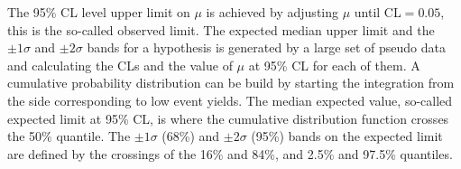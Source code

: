 The 95\% CL level upper limit on $\mu$ is achieved by adjusting $\mu$ until CL$ = 0.05$, this is the so-called observed limit. The expected median upper limit and the $\pm 1\sigma$ and $\pm 2 \sigma$ bands for a hypothesis is generated by a large set of pseudo data and calculating the CLs and the value of $\mu$ at 95\% CL for each of them. A cumulative probability distribution can be build by starting the integration from the side corresponding to low event yields. The median expected value, so-called expected limit at 95\% CL, is where the cumulative distribution function crosses the 50\% quantile. The $\pm 1 \sigma$ (68\%)  and $\pm 2\sigma$ (95\%) bands on the expected limit are defined by the crossings of the 16\% and 84\%, and 2.5\% and 97.5\% quantiles.

